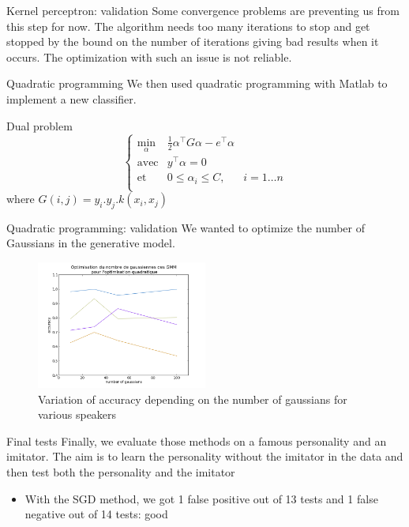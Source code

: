\documentclass[10pt]{beamer}
\begin{document}
\begin{frame}{Kernel perceptron: validation}
Some convergence problems are preventing us from this step for now. The algorithm needs too many iterations to stop and get stopped by the bound on the number of iterations giving bad results when it occurs. The optimization with such an issue is not reliable.
\end{frame}

\begin{frame}{Quadratic programming}
We then used quadratic programming with Matlab to implement a new classifier.
\begin{block}{Dual problem}
\begin{equation}
  \left\{
    \begin{array}{lll}
      \displaystyle\min_{\alpha}& \frac{1}{2} \alpha^\top  G \alpha - e^\top  \alpha&\\
      \mbox{avec} &y^\top  \alpha = 0 &\\
      \mbox{et} &0 \leq \alpha_i \leq C,& i=1 \dots n \\
    \end{array}
  \right.
\end{equation}
where $G(i,j) = y_i.y_j.k(x_i, x_j)$
\end{block}
\end{frame}

\begin{frame}{Quadratic programming: validation}
We wanted to optimize the number of Gaussians in the generative model.
\begin{figure}[!h]
\includegraphics[width=0.5\textwidth]{../rapport/img/opt_qp_pdf}
\caption{Variation of accuracy depending on the number of gaussians for various speakers}\label{opt_qp}
\end{figure}
\end{frame}

\begin{frame}{Final tests}
Finally, we evaluate those methods on a famous personality and an imitator. The aim is to learn the personality without the imitator in the data and then test both the personality and the imitator
\begin{itemize}
  \item With the SGD method, we got 1 false positive out of 13 tests and 1 false negative out of 14 tests: good
\end{itemize}
\end{frame}
\end{document}
